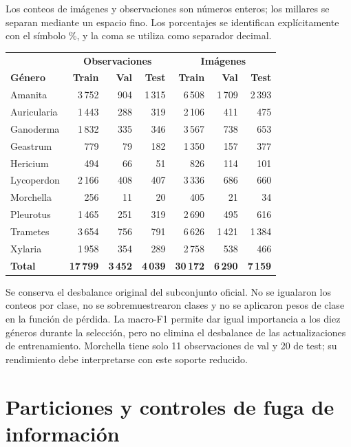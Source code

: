 \documentclass[11pt,a4paper]{article}
\begin{document}
Los conteos de imágenes y observaciones son números enteros; los millares se
separan mediante un espacio fino. Los porcentajes se identifican explícitamente
con el símbolo \(\%\), y la coma se utiliza como separador decimal.

\begin{center}
\small
\begin{tabular}{lrrr|rrr}
\toprule
& \multicolumn{3}{c}{\textbf{Observaciones}} & \multicolumn{3}{c}{\textbf{Imágenes}}\\
\textbf{Género} & \textbf{Train} & \textbf{Val} & \textbf{Test} & \textbf{Train} & \textbf{Val} & \textbf{Test}\\
\midrule
Amanita & 3\,752 & 904 & 1\,315 & 6\,508 & 1\,709 & 2\,393\\
Auricularia & 1\,443 & 288 & 319 & 2\,106 & 411 & 475\\
Ganoderma & 1\,832 & 335 & 346 & 3\,567 & 738 & 653\\
Geastrum & 779 & 79 & 182 & 1\,350 & 157 & 377\\
Hericium & 494 & 66 & 51 & 826 & 114 & 101\\
Lycoperdon & 2\,166 & 408 & 407 & 3\,336 & 686 & 660\\
Morchella & 256 & 11 & 20 & 405 & 21 & 34\\
Pleurotus & 1\,465 & 251 & 319 & 2\,690 & 495 & 616\\
Trametes & 3\,654 & 756 & 791 & 6\,626 & 1\,421 & 1\,384\\
Xylaria & 1\,958 & 354 & 289 & 2\,758 & 538 & 466\\
\midrule
\textbf{Total} & \textbf{17\,799} & \textbf{3\,452} & \textbf{4\,039} & \textbf{30\,172} & \textbf{6\,290} & \textbf{7\,159}\\
\bottomrule
\end{tabular}
\end{center}

Se conserva el desbalance original del subconjunto oficial. No se igualaron los
conteos por clase, no se sobremuestrearon clases y no se aplicaron pesos de clase
en la función de pérdida. La macro-F1 permite dar igual importancia a los diez
géneros durante la selección, pero no elimina el desbalance de las actualizaciones
de entrenamiento. Morchella tiene solo 11 observaciones de val y 20 de test;
su rendimiento debe interpretarse con este soporte reducido.

\section{Particiones y controles de fuga de información}
\end{document}
